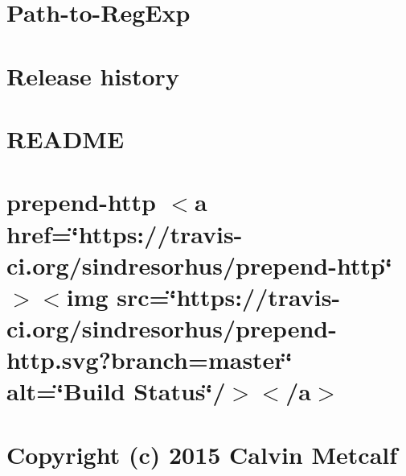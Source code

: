\let\mypdfximage\pdfximage\def\pdfximage{\immediate\mypdfximage}\documentclass[twoside]{book}
\newcommand{\+}{\discretionary{\mbox{\scriptsize$\hookleftarrow$}}{}{}}
\begin{document}
\chapter{Path-\/to-\/\+Reg\+Exp}
\label{md__c_1__git_hub__p_r_o_y_e_c_t_o-_i_i_i-_g_o_t_rest-api_node_modules_path-to-regexp__readme}

\chapter{Release history}
\label{md__c_1__git_hub__p_r_o_y_e_c_t_o-_i_i_i-_g_o_t_rest-api_node_modules_picomatch__c_h_a_n_g_e_l_o_g}

\chapter{R\+E\+A\+D\+ME}
\label{md__c_1__git_hub__p_r_o_y_e_c_t_o-_i_i_i-_g_o_t_rest-api_node_modules_picomatch__r_e_a_d_m_e}

\chapter{prepend-\/http $<$a href=\char`\"{}https\+://travis-\/ci.\+org/sindresorhus/prepend-\/http\char`\"{}$>$$<$img src=\char`\"{}https\+://travis-\/ci.\+org/sindresorhus/prepend-\/http.\+svg?branch=master\char`\"{} alt=\char`\"{}\+Build Status\char`\"{}/$>$$<$/a$>$}
\label{md__c_1__git_hub__p_r_o_y_e_c_t_o-_i_i_i-_g_o_t_rest-api_node_modules_prepend-http_readme}

\chapter{Copyright (c) 2015 Calvin Metcalf}
\label{md__c_1__git_hub__p_r_o_y_e_c_t_o-_i_i_i-_g_o_t_rest-api_node_modules_process-nextick-args_license}

\end{document}

